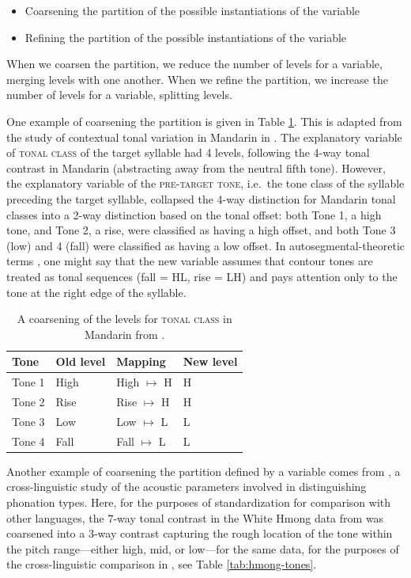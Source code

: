 \documentclass[12pt]{article}
\begin{document}
\begin{itemize}
  \item Coarsening the partition of the possible instantiations of the
  variable
  \item Refining the partition of the possible instantiations of the
  variable
\end{itemize}

When we coarsen the partition, we reduce the number of levels for a
variable, merging levels with one another. When we refine the
partition, we increase the number of levels for a variable, splitting
levels. 

One example of coarsening the partition is given in Table
\ref{tab:tonal-class}. This is adapted from the study of contextual
tonal variation in Mandarin in \cite[p.\ 70]{Xu:1997a}. The
explanatory variable of \textsc{tonal class} of the target syllable
had 4 levels, following the 4-way tonal contrast in Mandarin
(abstracting away from the neutral fifth tone). However, the
explanatory variable of the \textsc{pre-target tone}, i.e.\ the tone
class of the syllable preceding the target syllable, collapsed the
4-way distinction for Mandarin tonal classes into a 2-way distinction
based on the tonal offset: both Tone 1, a high tone, and Tone 2, a
rise, were classified as having a high offset, and both Tone 3 (low) and
4 (fall) were classified as having a low offset. In
autosegmental-theoretic terms  \citep{Goldsmith:1990,Goldsmith:1976},
one might say that the new variable assumes that contour tones are treated as tonal
sequences (fall = HL, rise = LH) and pays attention only to the tone at the
right edge of the syllable.  

\begin{table}[!h]
  \centering
  \begin{tabular}{l | l l l}
    Tone & Old level & Mapping & New level\\\hline
    Tone 1 & High & High $\mapsto$ H & H\\
    Tone 2 & Rise  & Rise $\mapsto$ H & H\\
    Tone 3 & Low & Low $\mapsto$ L & L\\
    Tone 4 & Fall  & Fall $\mapsto$ L & L\\
  \end{tabular}
  \caption{A coarsening of the levels for \textsc{tonal class} in
    Mandarin from \citet{Xu:1997a}.}
  \label{tab:tonal-class}
\end{table}

Another example of coarsening the partition defined by a variable
comes from \citet{Keating:2011}, a cross-linguistic study of the
acoustic parameters involved in distinguishing phonation types. Here,
for the purposes of standardization for comparison with other languages, the 7-way tonal
contrast in the White Hmong data from \citet{Esposito:2009, Esposito:2012} was coarsened into a 3-way contrast capturing
the rough location of the tone within the pitch range---either high,
mid, or low---for the same data, for the purposes of the cross-linguistic comparison
in \citet{Keating:2011}, see Table \ref{tab:hmong-tones}. 
\end{document}
